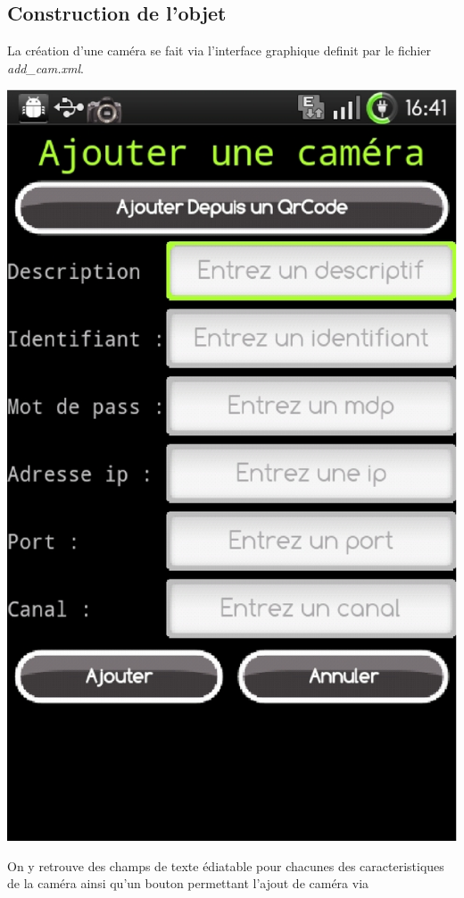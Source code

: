 \subsection{Construction de l'objet}
La création d'une caméra se fait via l'interface graphique definit par le
fichier \textit{add\_cam.xml}.\newline
\begin{center}
\includegraphics[scale=0.3]{Images/addCamScreenShot.eps}
\newline\end{center} On y retrouve des champs de texte édiatable pour chacunes
des caracteristiques de la caméra ainsi qu'un bouton permettant l'ajout de caméra via
